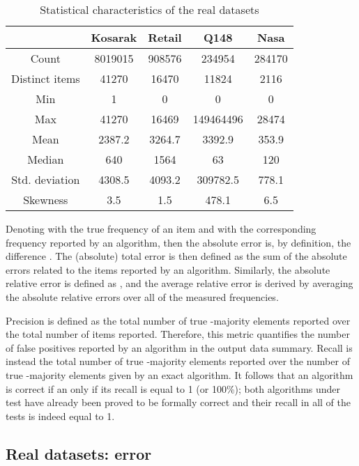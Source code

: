 \documentclass[final,3p,times]{elsarticle}
\begin{document}
\begin{table}
\renewcommand{\arraystretch}{1.3}
 \caption{Statistical characteristics of the real datasets}
      \label{data}
	\centering
    \begin{tabular}{|c |  c |  c  | c | c |}
    \hline
      & Kosarak & Retail & Q148 & Nasa  \\ \hline
      \hline
    Count &  8019015 & 908576 & 234954 & 284170 \\ \hline
    Distinct items & 41270 & 16470 & 11824 & 2116 \\ \hline
    Min & 1 & 0 & 0 &  0  \\ \hline 
    Max & 41270 & 16469 & 149464496 & 28474 \\ \hline 
    Mean & 2387.2 & 3264.7 & 3392.9 & 353.9  \\ \hline
    Median & 640 & 1564 & 63 & 120 \\ \hline
    Std. deviation & 4308.5 & 4093.2 & 309782.5 & 778.1 \\ \hline
    Skewness & 3.5 & 1.5 & 478.1 & 6.5  \\ \hline
    \end{tabular}
    \end{table}

Denoting with   the true frequency of an item and with  the corresponding frequency reported by an algorithm, then the absolute error is, by definition, the difference . The (absolute) total error is then defined as the sum of the absolute errors related to the items reported by an algorithm. Similarly, the absolute relative error is defined as , and the average relative error is derived by averaging the absolute relative errors over all of the measured frequencies.

Precision is defined as the total number of true -majority elements reported over the total number of items reported. Therefore, this metric quantifies the number of false positives reported by an algorithm in the output data summary. Recall is instead the total number of true -majority elements reported over the number of true -majority elements given by an exact algorithm. It follows that an algorithm is correct if an only if its recall is equal to 1 (or 100\%); both algorithms under test have already been proved to be formally correct and their recall in all of the tests is indeed equal to 1.

\subsection{Real datasets: error}
\end{document}
